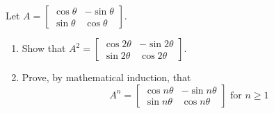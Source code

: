 \documentclass[12pt,letterpaper]{hmcpset}
\begin{document}
\begin{problem}[3.1.38]

Let $A = \begin{bmatrix}
		\cos{\theta} & -\sin{\theta}\\
		\sin{\theta} & \cos{\theta}
	\end{bmatrix}$.\\
	\begin{enumerate}
		\item
			Show that $A^2 = \begin{bmatrix}
				\cos{2\theta} & -\sin{2\theta}\\
				\sin{2\theta} & \cos{2\theta}
				\end{bmatrix}$.
		\item
			Prove, by mathematical induction, that $$A^n = \begin{bmatrix}
				\cos{n\theta} & -\sin{n\theta}\\
				\sin{n\theta} & \cos{n\theta}
				\end{bmatrix} \text{ for } n \geq 1$$
	\end{enumerate}
\end{problem}

\begin{solution}
\vfill
\end{solution}
\end{document}
